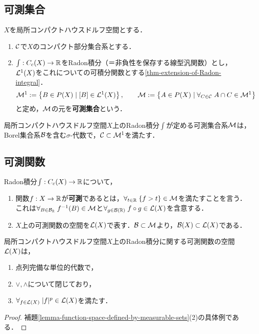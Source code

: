 \documentclass[uplatex,dvipdfmx]{jsreport}
\begin{document}
\subsection{可測集合}

\begin{definition}\label{def-measurable-sets}
    $X$を局所コンパクトハウスドルフ空間とする．
    \begin{enumerate}
        \item $\mathcal{C}$で$X$のコンパクト部分集合系とする．
        \item $\int:C_c(X)\to\mathbb{R}$をRadon積分（＝非負性を保存する線型汎関数）とし，$\mathcal{L}^1(X)$をこれについての可積分関数とする\ref{thm-extension-of-Radon-integral}．
        \[\mathcal{M}^1:=\left\{B\in P(X)\mid [B]\in\mathcal{L}^1(X)\right\},\qquad\mathcal{M}:=\left\{A\in P(X)\mid\forall_{C\in\mathcal{C}}\;A\cap C\in\mathcal{M}^1\right\}\]
        と定め，$\mathcal{M}$の元を\textbf{可測集合}という．
    \end{enumerate}
\end{definition}

\begin{proposition}
    局所コンパクトハウスドルフ空間$X$上のRadon積分$\int$が定める可測集合系$\mathcal{M}$は，Borel集合系$\mathcal{B}$を含む$\sigma$-代数で，$\mathcal{C}\subset\mathcal{M}^1$を満たす．
\end{proposition}

\subsection{可測関数}

\begin{definition}\label{def-measurable-function}
    Radon積分$\int:C_c(X)\to\mathbb{R}$について，
    \begin{enumerate}
        \item 関数$f:X\to\mathbb{R}$が\textbf{可測}であるとは，$\forall_{t\in\mathbb{R}}\;\{f>t\}\in\mathcal{M}$を満たすことを言う．これは$\forall_{B\in\mathcal{B}_{\mathbb{R}}}\;f^{-1}(B)\in\mathcal{M}$と$\forall_{g\in\mathcal{B}(\mathbb{R})}\;f\circ g\in\mathcal{L}(X)$を含意する．
        \item $X$上の可測関数の空間を$\mathcal{L}(X)$で表す．$\mathcal{B}\subset\mathcal{M}$より，$\mathcal{B}(X)\subset\mathcal{L}(X)$である．
    \end{enumerate}
\end{definition}

\begin{proposition}
    局所コンパクトハウスドルフ空間$X$上のRadon積分に関する可測関数の空間$\mathcal{L}(X)$は，
    \begin{enumerate}
        \item 点列完備な単位的代数で，
        \item $\lor,\land$について閉じており，
        \item $\forall_{f\in\mathcal{L}(X)}\;\lvert f\rvert^p\in\mathcal{L}(X)$を満たす．
    \end{enumerate}
\end{proposition}
\begin{proof}
    補題\ref{lemma-function-space-defined-by-measurable-sets}(2)の具体例である．
\end{proof}
\end{document}

